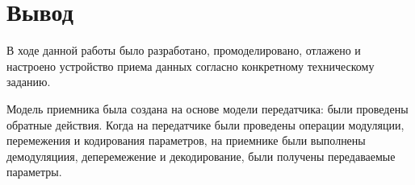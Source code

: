 \documentclass[a4paper,12pt]{article}
\begin{document}


\section{Вывод}

В ходе данной работы было разработано, промоделировано, отлажено и настроено устройство приема данных согласно конкретному техническому заданию. 

Модель приемника была создана на основе модели передатчика: были проведены обратные действия. Когда на передатчике были проведены операции модуляции, перемежения и кодирования параметров, на приемнике были выполнены демодуляциия, деперемежение и декодирование, были получены передаваемые параметры.
\end{document}
